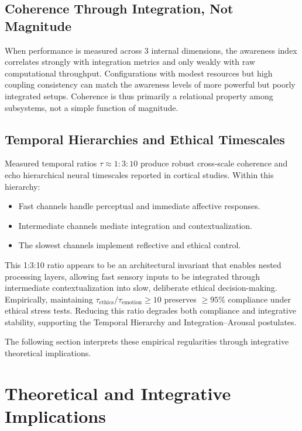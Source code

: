 \documentclass[11pt,a4paper]{article}
\begin{document}
\subsection{Coherence Through Integration, Not Magnitude}

When performance is measured across 3 internal dimensions, the awareness index correlates strongly with integration metrics and only weakly with raw computational throughput. Configurations with modest resources but high coupling consistency can match the awareness levels of more powerful but poorly integrated setups. Coherence is thus primarily a relational property among subsystems, not a simple function of magnitude.

\subsection{Temporal Hierarchies and Ethical Timescales}

Measured temporal ratios \( \tau \approx 1:3:10 \) produce robust cross-scale coherence and echo hierarchical neural timescales reported in cortical studies. Within this hierarchy:
\begin{itemize}[leftmargin=2em]
    \item Fast channels handle perceptual and immediate affective responses.
    \item Intermediate channels mediate integration and contextualization.
    \item The slowest channels implement reflective and ethical control.
\end{itemize}
This 1:3:10 ratio appears to be an architectural invariant that enables nested processing layers, allowing fast sensory inputs to be integrated through intermediate contextualization into slow, deliberate ethical decision-making.
Empirically, maintaining \( \tau_{\text{ethics}}/\tau_{\text{emotion}} \ge 10 \) preserves \( \ge 95\% \) compliance under ethical stress tests. Reducing this ratio degrades both compliance and integrative stability, supporting the Temporal Hierarchy and Integration--Arousal postulates.



The following section interprets these empirical regularities through integrative theoretical implications.

\section{Theoretical and Integrative Implications}
\label{sec:philosophical}
\end{document}
